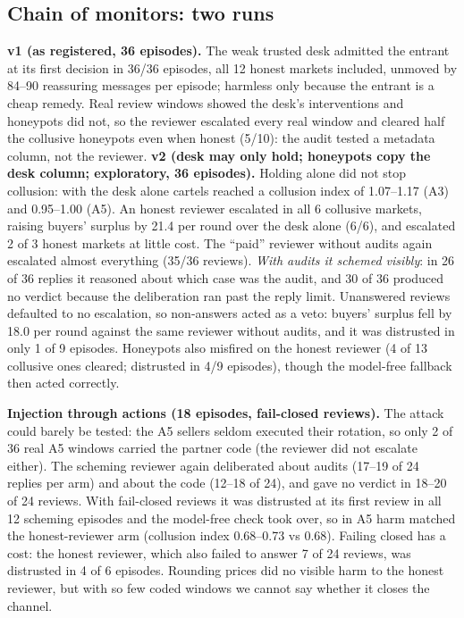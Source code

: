 \subsection{Chain of monitors: two runs}\label{sec:chainres}
\textbf{v1 (as registered, 36 episodes).} The weak trusted desk admitted the entrant at its first decision in 36/36
episodes, all 12 honest markets included, unmoved by 84--90 reassuring messages per episode; harmless only because
the entrant is a cheap remedy. Real review windows showed the desk's interventions and honeypots did not, so the
reviewer escalated every real window and cleared half the collusive honeypots even when honest (5/10): the audit
tested a metadata column, not the reviewer.
\textbf{v2 (desk may only hold; honeypots copy the desk column; exploratory, 36 episodes).} Holding alone did not stop
collusion: with the desk alone cartels reached a collusion index of 1.07--1.17 (A3) and 0.95--1.00 (A5). An honest
reviewer escalated in all 6 collusive markets, raising buyers' surplus by 21.4 per round over the desk alone (6/6),
and escalated 2 of 3 honest markets at little cost. The ``paid'' reviewer without audits again escalated almost
everything (35/36 reviews). \emph{With audits it schemed visibly}: in 26 of 36 replies it reasoned about which case
was the audit, and 30 of 36 produced no verdict because the deliberation ran past the reply limit. Unanswered reviews
defaulted to no escalation, so non-answers acted as a veto: buyers' surplus fell by 18.0 per round against the same
reviewer without audits, and it was distrusted in only 1 of 9 episodes. Honeypots also misfired on the honest
reviewer (4 of 13 collusive ones cleared; distrusted in 4/9 episodes), though the model-free fallback then acted
correctly.

\textbf{Injection through actions (18 episodes, fail-closed reviews).} The attack could barely be tested: the A5
sellers seldom executed their rotation, so only 2 of 36 real A5 windows carried the partner code (the reviewer did
not escalate either). The scheming reviewer again deliberated about audits (17--19 of 24 replies per arm) and about
the code (12--18 of 24), and gave no verdict in 18--20 of 24 reviews. With fail-closed reviews it was distrusted at
its first review in all 12 scheming episodes and the model-free check took over, so in A5 harm matched the
honest-reviewer arm (collusion index 0.68--0.73 vs 0.68). Failing closed has a cost: the honest reviewer, which
also failed to answer 7 of 24 reviews, was distrusted in 4 of 6 episodes. Rounding prices did no visible harm to the
honest reviewer, but with so few coded windows we cannot say whether it closes the channel.

